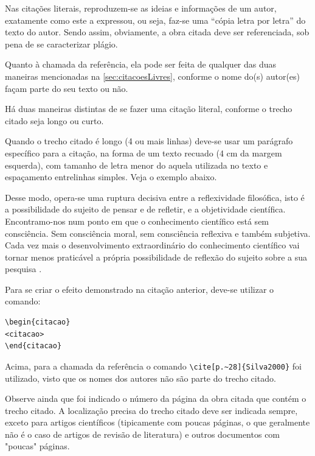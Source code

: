 \begin{apendicesenv}
Nas citações literais, reproduzem-se as ideias e informações de um autor,
exatamente como este a expressou, ou seja, faz-se uma ``cópia letra por letra''
do texto do autor. Sendo assim, obviamente, a obra citada deve ser referenciada,
sob pena de se caracterizar plágio.

Quanto à chamada da referência, ela pode ser feita de qualquer das duas maneiras
mencionadas na \autoref{sec:citacoesLivres}, conforme o nome do(s) autor(es)
façam parte do seu texto ou não.

Há duas maneiras distintas de se fazer uma citação literal, conforme o trecho
citado seja longo ou curto.

Quando o trecho citado é longo (4 ou mais linhas) deve-se usar um parágrafo
específico para a citação, na forma de um texto recuado (4 cm da margem
esquerda), com tamanho de letra menor do aquela utilizada no texto e espaçamento
entrelinhas simples. Veja o exemplo abaixo.

\begin{citacao}
    Desse modo, opera-se uma ruptura decisiva entre a reflexividade filosófica,
    isto é a possibilidade do sujeito de pensar e de refletir, e a objetividade
    científica. Encontramo-nos num ponto em que o conhecimento científico está
    sem consciência. Sem consciência moral, sem consciência reflexiva e também
    subjetiva. Cada vez mais o desenvolvimento extraordinário do conhecimento
    científico vai tornar menos praticável a própria possibilidade de reflexão
    do sujeito sobre a sua pesquisa \cite[p.~28]{Silva2000}.
\end{citacao}

Para se criar o efeito demonstrado na citação anterior, deve-se utilizar o
comando:

\begin{verbatim}
\begin{citacao}
<citacao>
\end{citacao}
\end{verbatim}

Acima, para a chamada da referência o comando \verb|\cite[p.~28]{Silva2000}| foi
utilizado, visto que os nomes dos autores não são parte do trecho citado.

Observe ainda que foi indicado o número da página da obra citada que contém o
trecho citado. A localização precisa do trecho citado deve ser indicada sempre,
exceto para artigos científicos (tipicamente com poucas páginas, o que
geralmente não é o caso de artigos de revisão de literatura) e outros documentos
com "poucas"{} páginas.


\end{apendicesenv}
